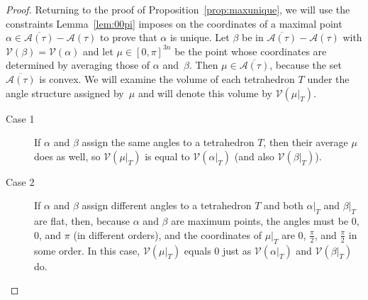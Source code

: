 \documentclass[reqno]{amsart}
\theoremstyle{plain}
\theoremstyle{definition}
\begin{document}
\begin{proof}
Returning to the proof of Proposition~\ref{prop:maxunique}, we will use the constraints Lemma~\ref{lem:00pi} imposes on the coordinates of a maximal point $\alpha\in\overline{\mathcal A(\tau)}-\mathcal A(\tau)$ to prove that $\alpha$ is unique. Let $\beta$ be in $\overline{\mathcal A(\tau)}-\mathcal A(\tau)$ with $\mathcal{V}(\beta)=\mathcal{V}(\alpha)$ and let $\mu\in[0,\pi]^{3n}$ be the point whose coordinates are determined by averaging those of $\alpha$ and~$\beta$. Then $\mu\in\overline{\mathcal A(\tau)}$, because the set $\overline{\mathcal A(\tau)}$ is convex.  We will examine the volume of each tetrahedron $T$ under the angle structure assigned by~$\mu$ and will denote this volume by $\mathcal{V}(\mu|_T)$.

\begin{description}
    \item [Case 1] If $\alpha$ and $\beta$ assign the same angles to a tetrahedron $T$, then their average $\mu$ does as well, so $\mathcal{V}(\mu|_T)$ is equal to $\mathcal{V}(\alpha|_T)$ (and also $\mathcal{V}(\beta|_T)$).
    
    \item[Case 2] If $\alpha$ and $\beta$ assign different angles to a tetrahedron $T$ and both $\alpha|_T$ and $\beta|_T$ are flat, then, because $\alpha$ and $\beta$ are maximum points, the angles must be $0$, $0$, and $\pi$ (in different orders), and the coordinates of $\mu|_T$ are $0$, $\frac\pi2$, and $\frac\pi2$ in some order.  In this case, $\mathcal{V}(\mu|_T)$ equals $0$ just as $\mathcal{V}(\alpha|_T)$ and $\mathcal{V}(\beta|_{T})$ do.
    

\end{description}
\end{proof}
\end{document}
